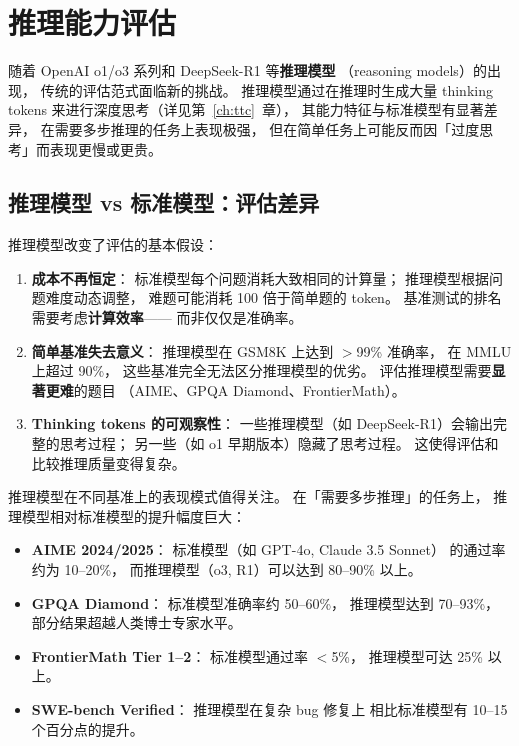 \section{推理能力评估}
\label{sec:reasoning-eval}

随着 OpenAI o1/o3 系列和 DeepSeek-R1 等\textbf{推理模型}
（reasoning models）的出现，
传统的评估范式面临新的挑战。
推理模型通过在推理时生成大量 thinking tokens
来进行深度思考（详见第~\ref{ch:ttc}~章），
其能力特征与标准模型有显著差异，
在需要多步推理的任务上表现极强，
但在简单任务上可能反而因「过度思考」而表现更慢或更贵。

\subsection{推理模型 vs 标准模型：评估差异}

\begin{corebox}[推理模型的独特评估挑战]
推理模型改变了评估的基本假设：
\begin{enumerate}[noitemsep]
  \item \textbf{成本不再恒定}：
        标准模型每个问题消耗大致相同的计算量；
        推理模型根据问题难度动态调整，
        难题可能消耗 100 倍于简单题的 token。
        基准测试的排名需要考虑\textbf{计算效率}——
        而非仅仅是准确率。
  \item \textbf{简单基准失去意义}：
        推理模型在 GSM8K 上达到 $>$99\% 准确率，
        在 MMLU 上超过 90\%，
        这些基准完全无法区分推理模型的优劣。
        评估推理模型需要\textbf{显著更难}的题目
        （AIME、GPQA Diamond、FrontierMath）。
  \item \textbf{Thinking tokens 的可观察性}：
        一些推理模型（如 DeepSeek-R1）会输出完整的思考过程；
        另一些（如 o1 早期版本）隐藏了思考过程。
        这使得评估和比较推理质量变得复杂。
\end{enumerate}
\end{corebox}

推理模型在不同基准上的表现模式值得关注。
在「需要多步推理」的任务上，
推理模型相对标准模型的提升幅度巨大：
\begin{itemize}[noitemsep]
  \item \textbf{AIME 2024/2025}：
        标准模型（如 GPT-4o, Claude 3.5 Sonnet）
        的通过率约为 10--20\%，
        而推理模型（o3, R1）可以达到 80--90\% 以上。
  \item \textbf{GPQA Diamond}：
        标准模型准确率约 50--60\%，
        推理模型达到 70--93\%，
        部分结果超越人类博士专家水平。
  \item \textbf{FrontierMath Tier 1--2}：
        标准模型通过率 $<$5\%，
        推理模型可达 25\% 以上。
  \item \textbf{SWE-bench Verified}：
        推理模型在复杂 bug 修复上
        相比标准模型有 10--15 个百分点的提升。
\end{itemize}

